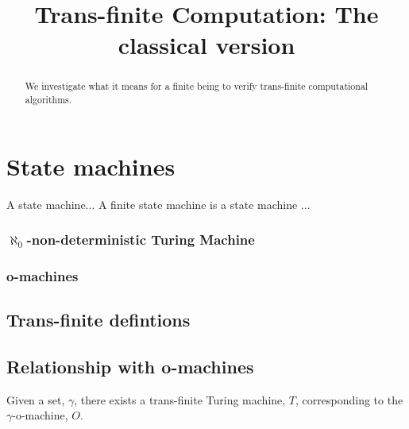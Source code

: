 \documentclass[a4paper,openany]{amsbook}
\begin{document}
\frontmatter
\sloppy

\title[Computation: Classical version]{Trans-finite Computation: The classical version}

%

\begin{abstract}
We investigate what it means for a finite being to verify trans-finite computational
algorithms.
\end{abstract} 
\maketitle 
\tableofcontents 
\mainmatter







\chapter{State machines}

\begin{definition}

A state machine... A finite state machine is a state machine ...

\end{definition}

\subsection{$\aleph_0$-non-deterministic Turing Machine}

\subsection{o-machines}

\section{Trans-finite defintions}

\section{Relationship with o-machines}

\begin{theorem}

Given a set, $\gamma$, there exists a trans-finite Turing machine, $T$, corresponding to
the $\gamma$-o-machine, $O$.

\end{theorem}
\end{document}
